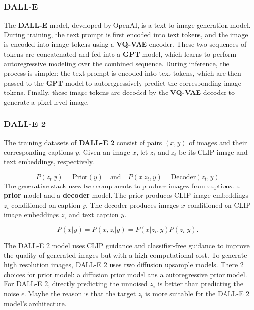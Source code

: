 \documentclass{article}
\begin{document}
\subsubsection{DALL-E}

The \textbf{DALL-E} model, developed by OpenAI, is a text-to-image generation model. During training, the 
text prompt is first encoded into text tokens, and the image is encoded into image tokens using a 
\textbf{VQ-VAE} encoder. These two sequences of tokens are concatenated and fed into a \textbf{GPT} model, 
which learns to perform autoregressive modeling over the combined sequence.
During inference, the process is simpler: the text prompt is encoded into text tokens, which are then passed 
to the \textbf{GPT} model to autoregressively predict the corresponding image tokens. Finally, these image 
tokens are decoded by the \textbf{VQ-VAE} decoder to generate a pixel-level image.

\subsubsection{DALL-E 2}

The training datasets of \textbf{DALL-E 2} consist of pairs $(x, y)$ of images and their corresponding 
captions $y$. Given an image $x$, let $z_i$ and $z_t$ be its CLIP image and text embeddings, respectively.

\begin{equation}
P(z_t | y) = \text{Prior}(y) \quad \text{and} \quad P(x | z_t, y) = \text{Decoder}(z_t, y)
\end{equation}
The generative stack uses two components to produce images from captions: a \textbf{prior} model and a 
\textbf{decoder} model. The prior produces CLIP image embeddings $z_i$ conditioned on caption $y$. The 
decoder produces images $x$ conditioned on CLIP image embeddings $z_i$ and text caption $y$.

\begin{equation}
P(x|y) = P(x, z_i | y) = P(x|z_i, y) P(z_i|y).
\end{equation}

The DALL-E 2 model uses CLIP guidance and classifier-free guidance to improve the quality of generated 
images but with a high computational cost.
To generate high resolution images, DALL-E 2 uses two diffusion upsample models.
There 2 choices for prior model: a diffusion prior model ans a autoregressive prior model. 
For DALL-E 2, directly predicting the unnoised $z_i$ is better than predicting the noise $\epsilon$.
Maybe the reason is that the target $z_i$ is more suitable for the DALL-E 2 model's architecture.
\end{document}

